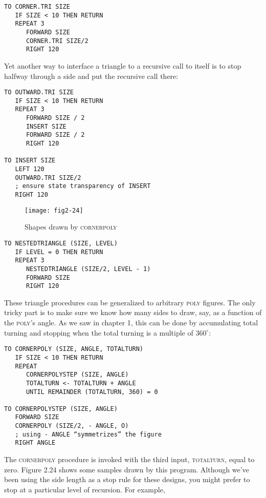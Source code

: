 \documentclass{book}
\begin{document}
\begin{verbatim}
TO CORNER.TRI SIZE
   IF SIZE < 10 THEN RETURN
   REPEAT 3
      FORWARD SIZE
      CORNER.TRI SIZE/2
      RIGHT 120
\end{verbatim}
Yet another way to interface a triangle to a recursive call to itself is to
stop halfway through a side and put the recursive call there:

\begin{verbatim}
TO OUTWARD.TRI SIZE
   IF SIZE < 10 THEN RETURN
   REPEAT 3
      FORWARD SIZE / 2
      INSERT SIZE
      FORWARD SIZE / 2
      RIGHT 120

TO INSERT SIZE
   LEFT 120
   OUTWARD.TRI SIZE/2
   ; ensure state transparency of INSERT
   RIGHT 120
\end{verbatim}
\begin{figure}
\begin{center}
\texttt{[image: fig2-24]}
\caption{Shapes drawn by \textsc{cornerpoly}}
\end{center}
\end{figure}

\begin{verbatim}
TO NESTEDTRIANGLE (SIZE, LEVEL)
   IF LEVEL = 0 THEN RETURN
   REPEAT 3
      NESTEDTRIANGLE (SIZE/2, LEVEL - 1)
      FORWARD SIZE
      RIGHT 120
\end{verbatim}
These triangle procedures can be generalized to arbitrary \textsc{poly} figures.
The only tricky part is to make sure we know how many sides to draw,
say, as a function of the \textsc{poly}'s angle. As we saw in chapter 1, this
can be done by accumulating total turning and stopping when the total
turning is a multiple of $360^{\circ}$:

\begin{verbatim}
TO CORNERPOLY (SIZE, ANGLE, TOTALTURN)
   IF SIZE < 10 THEN RETURN
   REPEAT
      CORNERPOLYSTEP (SIZE, ANGLE)
      TOTALTURN <- TOTALTURN + ANGLE
      UNTIL REMAINDER (TOTALTURN, 360) = 0

TO CORNERPOLYSTEP (SIZE, ANGLE)
   FORWARD SIZE
   CORNERPOLY (SIZE/2, - ANGLE, O)
   ; using - ANGLE “symmetrizes” the figure
   RIGHT ANGLE
\end{verbatim}
The \textsc{cornerpoly} procedure is invoked with the third input, \textsc{totalturn},
equal to zero. Figure 2.24 shows some samples drawn by this program.
Although we've been using the side length as a stop rule for these
designs, you might prefer to stop at a particular level of recursion. For
example,
\end{document}
